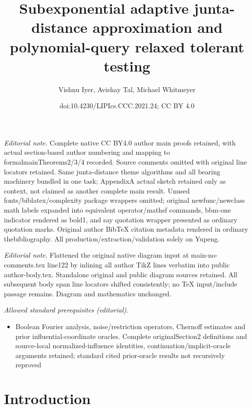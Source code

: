 \documentclass[10pt,a4paper]{article}
\title{Subexponential adaptive junta-distance approximation and polynomial-query relaxed tolerant testing}
\author{Vishnu Iyer, Avishay Tal, Michael Whitmeyer}
\date{doi:10.4230/LIPIcs.CCC.2021.24; CC BY 4.0}
\theoremstyle{plain}
\theoremstyle{remark}
\theoremstyle{plain}
\begin{document}
\maketitle
\noindent\textit{Editorial note.} Complete native CC BY4.0 author main proofs retained, with actual section-based author numbering and mapping to formalmainTheorems2/3/4 recorded. Source comments omitted with original line locators retained. Same junta-distance theme algorithms and all bearing machinery bundled in one task; AppendixA actual sketch retained only as context, not claimed as another complete main result. Unused fonts/biblatex/complexity package wrappers omitted; original newfunc/newclass math labels expanded into equivalent operator/mathsf commands, bbm-one indicator rendered as bold1, and say quotation wrapper presented as ordinary quotation marks. Original author BibTeX citation metadata rendered in ordinary thebibliography. All production/extraction/validation solely on Yupeng.\par\medskip
\noindent\textit{Editorial note.} Flattened the original native diagram input at main-no-comments.tex line122 by inlining all author TikZ lines verbatim into public author-body.tex. Standalone original and public diagram sources retained. All subsequent body span line locators shifted consistently; no TeX input/include passage remains. Diagram and mathematics unchanged.\par\medskip
\noindent\textit{Allowed standard prerequisites (editorial).}\begin{itemize}
\item Boolean Fourier analysis, noise/restriction operators, Chernoff estimates and prior influential-coordinate oracles. Complete originalSection2 definitions and source-local normalized-influence identities, continuation/implicit-oracle arguments retained; standard cited prior-oracle results not recursively reproved
\end{itemize}\medskip
\section{Introduction}
\label{section:introduction}

%
\end{document}
